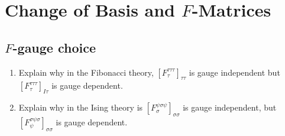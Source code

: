 \documentclass{book}
\begin{document}
\chapter{Change of Basis and $F$-Matrices}

\section{$F$\textbf{-gauge choice}}

\begin{enumerate}
\item Explain why in the Fibonacci theory, $[F_{\tau }^{\tau \tau \tau } ]_{\tau \tau }$ is gauge independent but $[F_{\tau }^{\tau \tau \tau } ]_{I\tau }$ is gauge dependent.
\item Explain why in the Ising theory is $[F_{\sigma }^{\psi \sigma \psi } ]_{\sigma \sigma }$ is gauge independent, but $[F_{\psi }^{\sigma \psi \sigma } ]_{\sigma \sigma }$ is gauge dependent.
\end{enumerate}
\end{document}
